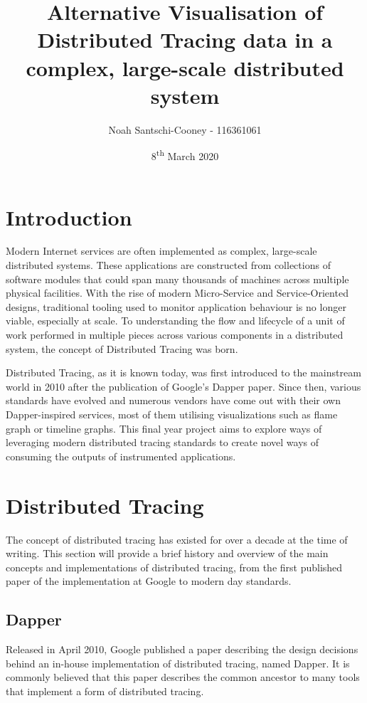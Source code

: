 \documentclass[pdftex,titlepage]{article}
\author{Noah Santschi-Cooney - 116361061}
\date{8\textsuperscript{th} March 2020}
\title{\textbf{Alternative Visualisation of Distributed Tracing data in a complex, large-scale distributed system}}
\begin{document}
    \maketitle
    \section{Introduction}

    Modern Internet services are often implemented as complex, large-scale distributed systems. 
    These applications are constructed from collections of software modules that could span many
    thousands of machines across multiple physical facilities. With the rise of modern 
    Micro-Service and Service-Oriented designs, traditional tooling used to monitor application 
    behaviour is no longer viable, especially at scale\cite{retrospective}. To understanding the flow and lifecycle 
    of a unit of work performed in multiple pieces across various components in a distributed system, 
    the concept of Distributed Tracing was born\cite{xtrace}. 
    
    Distributed Tracing, as it is known today, was first introduced to the mainstream world in 2010 after the publication
    of Google’s Dapper paper\cite{dapper}. Since then, various standards have evolved and numerous vendors have
    come out with their own Dapper-inspired services, most of them utilising visualizations such as
    flame graph or timeline graphs. This final year project aims to explore ways of leveraging modern 
    distributed tracing standards to create novel ways of consuming the outputs of instrumented applications.

    \section{Distributed Tracing}
    The concept of distributed tracing has existed for over a decade at the time of writing. 
    This section will provide a brief history and overview of the main concepts and implementations of distributed tracing,
    from the first published paper of the implementation at Google to modern day standards.

        \subsection{Dapper}
        Released in April 2010, Google published a paper describing the design decisions behind an in-house implementation 
        of distributed tracing, named Dapper. It is commonly believed that this paper describes the common ancestor to 
        many tools that implement a form of distributed tracing.
\end{document}
